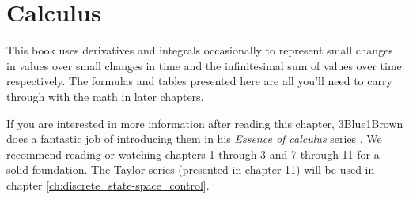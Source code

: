 
\chapter{Calculus}

This book uses derivatives and integrals occasionally to represent small changes
in values over small changes in time and the infinitesimal sum of values over
time respectively. The formulas and tables presented here are all you'll need to
carry through with the math in later chapters.

If you are interested in more information after reading this chapter,
3Blue1Brown does a fantastic job of introducing them in his \textit{Essence of
calculus} series \cite{bib:3b1b_calculus}. We recommend reading or watching
chapters 1 through 3 and 7 through 11 for a solid foundation. The Taylor series
(presented in chapter 11) will be used in chapter
\ref{ch:discrete_state-space_control}.

\renewcommand*{\chapterpath}{\partpath/calculus}




